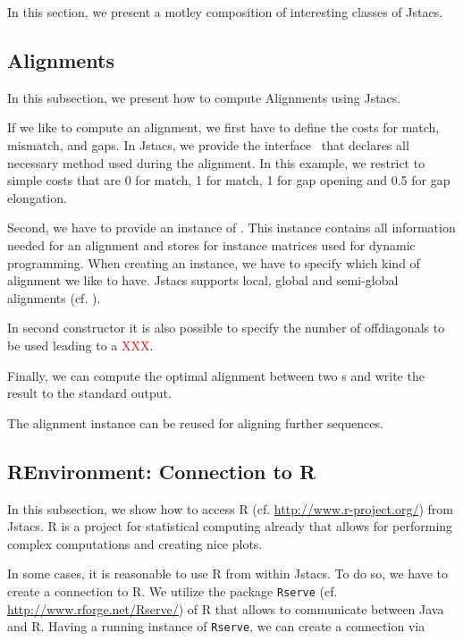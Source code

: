\setcounter{off}{595}

In this section, we present a motley composition of interesting classes of Jstacs.

\subsection{Alignments}

In this subsection, we present how to compute Alignments using Jstacs.

If we like to compute an alignment, we first have to define the costs for match, mismatch, and gaps. In Jstacs, we provide the interface \Costs~that declares all necessary method used during the alignment. In this example, we restrict to simple costs that are 0 for match, 1 for match, 1 for gap opening and 0.5 for gap elongation.
 
\addtocounter{off}{3}

Second, we have to provide an instance of \Alignment. This instance contains all information needed for an alignment and stores for instance matrices used for dynamic programming. When creating an instance, we have to specify which kind of alignment we like to have. Jstacs supports local, global and semi-global alignments (cf. \AlignmentType).  

\addtocounter{off}{4}

In second constructor it is also possible to specify the number of offdiagonals to be used leading to a \textcolor {red}{XXX}. 

Finally, we can compute the optimal alignment between two \Sequence s and write the result to the standard output.


The alignment instance can be reused for aligning further sequences.

\subsection{REnvironment: Connection to R}

In this subsection, we show how to access R (cf. \url{http://www.r-project.org/}) from Jstacs. R is a project for statistical computing already that allows for performing complex computations and creating nice plots.

In some cases, it is reasonable to use R from within Jstacs. To do so, we have to create a connection to R. We utilize the package \lstinline+Rserve+ (cf. \url{http://www.rforge.net/Rserve/}) of R that allows to communicate between Java and R. Having a running instance of \lstinline+Rserve+, we can create a connection via  

